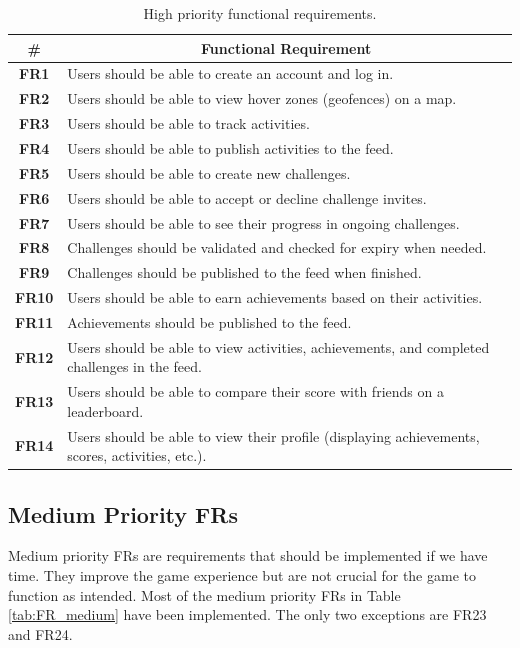 \begin{table}[H]
    \centering
    \begin{tabularx}{\textwidth}{|>{\small}c|X|}
    \hline
        \textbf{\#} & \multicolumn{1}{c|}{\textbf{Functional Requirement}} \\ \hline
        \textbf{FR1} & Users should be able to create an account and log in. \\
        \textbf{FR2} & Users should be able to view hover zones (geofences) on a map. \\
        \textbf{FR3} & Users should be able to track activities. \\
        \textbf{FR4} & Users should be able to publish activities to the feed. \\
        \textbf{FR5} & Users should be able to create new challenges. \\
        \textbf{FR6} & Users should be able to accept or decline challenge invites. \\
        \textbf{FR7} & Users should be able to see their progress in ongoing challenges. \\
        \textbf{FR8} & Challenges should be validated and checked for expiry when needed. \\
        \textbf{FR9} & Challenges should be published to the feed when finished. \\
        \textbf{FR10} & Users should be able to earn achievements based on their activities. \\
        \textbf{FR11} & Achievements should be published to the feed. \\
        \textbf{FR12} & Users should be able to view activities, achievements, and completed challenges in the feed. \\
        \textbf{FR13} & Users should be able to compare their score with friends on a leaderboard. \\
        \textbf{FR14} & Users should be able to view their profile (displaying achievements, scores, activities, etc.). \\ \hline
    \end{tabularx}
    \caption{High priority functional requirements.}
    \label{tab:FR_high}
    \vspace*{-\baselineskip}
\end{table}

\subsection{Medium Priority FRs}
Medium priority FRs are requirements that should be implemented if we have time. They improve the game experience but are not crucial for the game to function as intended. Most of the medium priority FRs in Table \ref{tab:FR_medium} have been implemented. The only two exceptions are FR23 and FR24.

